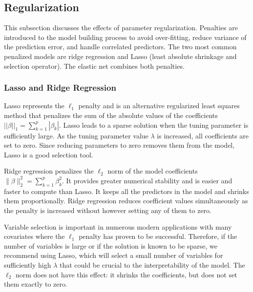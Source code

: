 \subsection{Regularization} \label{regularization}
This subsection discusses the effects of parameter regularization. Penalties are introduced to the model building process to avoid over-fitting, reduce variance of the prediction error, and handle correlated predictors. The two most common penalized models are ridge regression and Lasso (least absolute shrinkage and selection operator). The elastic net combines both penalties. 

\subsubsection{Lasso and Ridge Regression}

Lasso represents the $\ell_1$ penalty and is an alternative regularized least squares method that penalizes the sum of the absolute values of the coefficients 
$||\beta||_1=\sum_{k=1}^p |\beta_k|$. Lasso leads to a sparse solution when the tuning parameter is sufficiently large. As the tuning parameter value $\lambda$ is increased, all coefficients are set to zero. Since reducing
parameters to zero removes them from the model, Lasso is a good selection tool. 

Ridge regression penalizes the $\ell_2$ norm of the model coefficients $\| \beta \|_2^2=\sum_{k=1}^p \beta_k^2$. It provides greater numerical stability and is easier and faster to compute than Lasso. It keeps all the predictors in the model and shrinks them proportionally. Ridge regression reduces coefficient values simultaneously as the penalty is increased without however setting any of them to zero. 



Variable selection is important in numerous modern applications with many covariates where the $\ell_1$ penalty has proven to be successful. Therefore, if the number of variables is large or if the solution is known to be sparse, we recommend using Lasso, which will select a small number of variables for sufficiently high $\lambda$ that could be crucial to the interpretability of the model. The $\ell_2$ norm does not have this effect:  it shrinks the coefficients, but does not set them exactly to zero.  %


